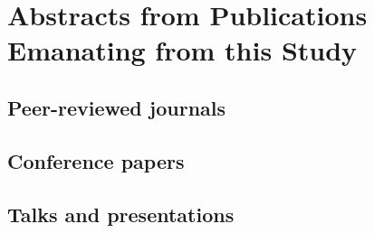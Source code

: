 \chapter{Abstracts from Publications Emanating from this Study }\label{chapter:AppendixB}

\section{Peer-reviewed journals}

\section{Conference papers}

\section{Talks and presentations}